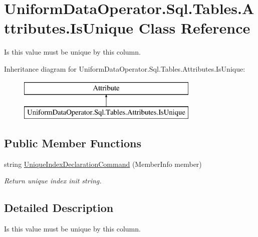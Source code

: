 \hypertarget{class_uniform_data_operator_1_1_sql_1_1_tables_1_1_attributes_1_1_is_unique}{}\section{Uniform\+Data\+Operator.\+Sql.\+Tables.\+Attributes.\+Is\+Unique Class Reference}
\label{class_uniform_data_operator_1_1_sql_1_1_tables_1_1_attributes_1_1_is_unique}


Is this value must be unique by this column.  


Inheritance diagram for Uniform\+Data\+Operator.\+Sql.\+Tables.\+Attributes.\+Is\+Unique\+:\begin{figure}[H]
\begin{center}
\leavevmode
\includegraphics[height=2.000000cm]{dd/d9c/class_uniform_data_operator_1_1_sql_1_1_tables_1_1_attributes_1_1_is_unique}
\end{center}
\end{figure}
\subsection*{Public Member Functions}
\begin{DoxyCompactItemize}
\item 
string \mbox{\hyperlink{class_uniform_data_operator_1_1_sql_1_1_tables_1_1_attributes_1_1_is_unique_a5d1cafbf328813bbce6b514abb6cf08e}{Unique\+Index\+Declaration\+Command}} (Member\+Info member)
\begin{DoxyCompactList}\small\item\em Return unique index init string. \end{DoxyCompactList}\end{DoxyCompactItemize}


\subsection{Detailed Description}
Is this value must be unique by this column. 




